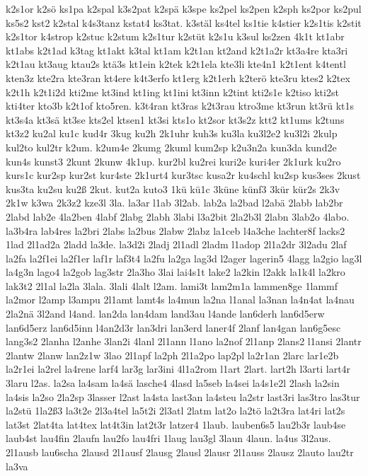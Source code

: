 {k2s1or
k2sö
ks1pa
k2spal
k3s2pat
k2spä
k3spe
ks2pel
ks2pen
k2sph
ks2por
ks2pul
ks5s2
kst2
k2stal
k4s3tanz
kstat4
ks3tat.
k3stäl
ks4tel
ks1tie
k4stier
k2s1tis
k2stit
k2s1tor
k4strop
k2stuc
k2stum
k2s1tur
k2stüt
k2s1u
k3sul
ks2zen
4k1t
kt1abr
kt1abs
k2t1ad
k3tag
kt1akt
k3tal
kt1am
k2t1an
kt2and
k2t1a2r
kt3a4re
kta3ri
k2t1au
kt3aug
ktau2s
ktä3s
kt1ein
k2tek
k2t1ela
kte3li
kte4n1
k2t1ent
k4tentl
kten3z
kte2ra
kte3ran
kt4ere
k4t3erfo
kt1erg
k2t1erh
k2terö
kte3ru
ktes2
k2tex
k2t1h
k2t1i2d
kti2me
kt3ind
kt1ing
kt1ini
kt3inn
k2tint
kti2s1e
k2tiso
kti2st
kti4ter
kto3b
k2t1of
kto5ren.
k3t4ran
kt3ras
k2t3rau
ktro3me
kt3run
kt3rü
kt1s
kt3s4a
kt3sä
kt3se
kts2el
ktsen1
kt3si
kts1o
kt2sor
kt3s2z
ktt2
kt1ums
k2tuns
kt3z2
ku2al
ku1c
kud4r
3kug
ku2h
2k1uhr
kuh3s
ku3la
ku3l2e2
ku3l2i
2kulp
kul2to
kul2tr
k2um.
k2um4e
2kumg
2kuml
kum2sp
k2u3n2a
kun3da
kund2e
kun4s
kunst3
2kunt
2kunw
4k1up.
kur2bl
ku2rei
kuri2e
kuri4er
2k1urk
ku2ro
kurs1c
kur2sp
kur2st
kur4ste
2k1urt4
kur3tsc
kusa2r
ku4schl
ku2sp
kus3ses
2kust
kus3ta
ku2su
ku2ß
2kut.
kut2a
kuto3
1kü
kü1c
3küne
künf3
3kür
kür2s
2k3v
2k1w
k3wa
2k3z2
kze3l
3la.
la3ar
l1ab
3l2ab.
lab2a
la2bad
l2abä
2labb
lab2br
2labd
lab2e
4la2ben
4labf
2labg
2labh
3labi
l3a2bit
2la2b3l
2labn
3lab2o
4labo.
la3b4ra
lab4res
la2bri
2labs
la2bus
2labw
2labz
la1ceb
l4a3che
lachter8f
lacks2
1lad
2l1ad2a
2ladd
la3de.
la3d2i
2ladj
2l1adl
2ladm
l1adop
2l1a2dr
3l2adu
2laf
la2fa
la2f1ei
la2f1er
laf1r
laf3t4
la2fu
la2ga
lag3d
l2ager
lagerin5
4lagg
la2gio
lag3l
la4g3n
lago4
la2gob
lag3str
2la3ho
3lai
lai4s1t
lake2
la2kin
l2akk
la1k4l
la2kro
lak3t2
2l1al
la2la
3lala.
3lali
4lalt
l2am.
lami3t
lam2m1a
lammen8ge
1lammf
la2mor
l2amp
l3ampu
2l1amt
lamt4s
la4mun
la2na
l1anal
la3nan
la4n4at
la4nau
2la2nä
3l2and
l4and.
lan2da
lan4dam
land3au
l4ande
lan6derh
lan6d5erw
lan6d5erz
lan6d5inn
l4an2d3r
lan3dri
lan3erd
laner4f
2lanf
lan4gan
lan6g5esc
lang3s2
2lanha
l2anhe
3lan2i
4lanl
2l1ann
l1ano
la2nof
2l1anp
2lans2
l1ansi
2lantr
2lantw
2lanw
lan2z1w
3lao
2l1apf
la2ph
2l1a2po
lap2pl
la2r1an
2larc
lar1e2b
la2r1ei
la2rel
la4rene
larf4
lar3g
lar3ini
4l1a2rom
l1art
2lart.
lart2h
l3arti
lart4r
3laru
l2as.
la2sa
la4sam
la4sä
lasche4
4lasd
la5seb
la4sei
la4s1e2l
2lash
la2sin
la4sis
la2so
2la2sp
3lasser
l2ast
la4sta
last3an
la4steu
la2str
last3ri
las3tro
las3tur
la2stü
1la2ß3
la3t2e
2l3a4tel
la5t2i
2l3atl
2latm
lat2o
la2tö
la2t3ra
lat4ri
lat2s
lat3st
2lat4ta
lat4tex
lat4t3in
lat2t3r
latzer4
1laub.
lauben6s5
lau2b3r
laub4se
laub4st
lau4fin
2laufn
lau2fo
lau4fri
1laug
lau3gl
3laun
4laun.
la4us
3l2aus.
2l1ausb
lau6scha
2lausd
2l1ausf
2lausg
2lausl
2lausr
2l1auss
2lausz
2lauto
lau2tr
la3va
}
